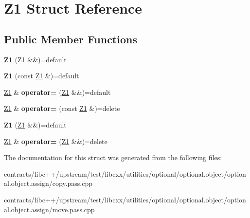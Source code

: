 \hypertarget{struct_z1}{}\section{Z1 Struct Reference}
\label{struct_z1}
\subsection*{Public Member Functions}
\begin{DoxyCompactItemize}
\item 
\mbox{\label{struct_z1_aa62e10676c914ad8cf4c01a86a69d9ab}} 
{\bfseries Z1} (\mbox{\hyperlink{struct_z1}{Z1}} \&\&)=default
\item 
\mbox{\label{struct_z1_a841848b9388b294a5b267f5ba3bd4cce}} 
{\bfseries Z1} (const \mbox{\hyperlink{struct_z1}{Z1}} \&)=default
\item 
\mbox{\label{struct_z1_a75ffc2499e0a881cb292e8dc05f2ce68}} 
\mbox{\hyperlink{struct_z1}{Z1}} \& {\bfseries operator=} (\mbox{\hyperlink{struct_z1}{Z1}} \&\&)=default
\item 
\mbox{\label{struct_z1_a3adc4316389f632cca4eec03b8cb77a8}} 
\mbox{\hyperlink{struct_z1}{Z1}} \& {\bfseries operator=} (const \mbox{\hyperlink{struct_z1}{Z1}} \&)=delete
\item 
\mbox{\label{struct_z1_aa62e10676c914ad8cf4c01a86a69d9ab}} 
{\bfseries Z1} (\mbox{\hyperlink{struct_z1}{Z1}} \&\&)=default
\item 
\mbox{\label{struct_z1_ad0c3e8e5fbda17b1bf42670f472fd371}} 
\mbox{\hyperlink{struct_z1}{Z1}} \& {\bfseries operator=} (\mbox{\hyperlink{struct_z1}{Z1}} \&\&)=delete
\end{DoxyCompactItemize}


The documentation for this struct was generated from the following files\+:\begin{DoxyCompactItemize}
\item 
contracts/libc++/upstream/test/libcxx/utilities/optional/optional.\+object/optional.\+object.\+assign/copy.\+pass.\+cpp\item 
contracts/libc++/upstream/test/libcxx/utilities/optional/optional.\+object/optional.\+object.\+assign/move.\+pass.\+cpp\end{DoxyCompactItemize}

